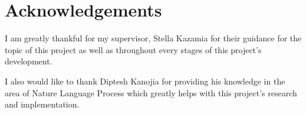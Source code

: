 
\chapter*{Acknowledgements}


I am greatly thankful for my supervisor, Stella Kazamia for their guidance for the topic of this project as well as throughout every stages of this project's development.

I also would like to thank Diptesh Kanojia for providing his knowledge in the area of Nature Language Process which greatly helps with this project's research and implementation.